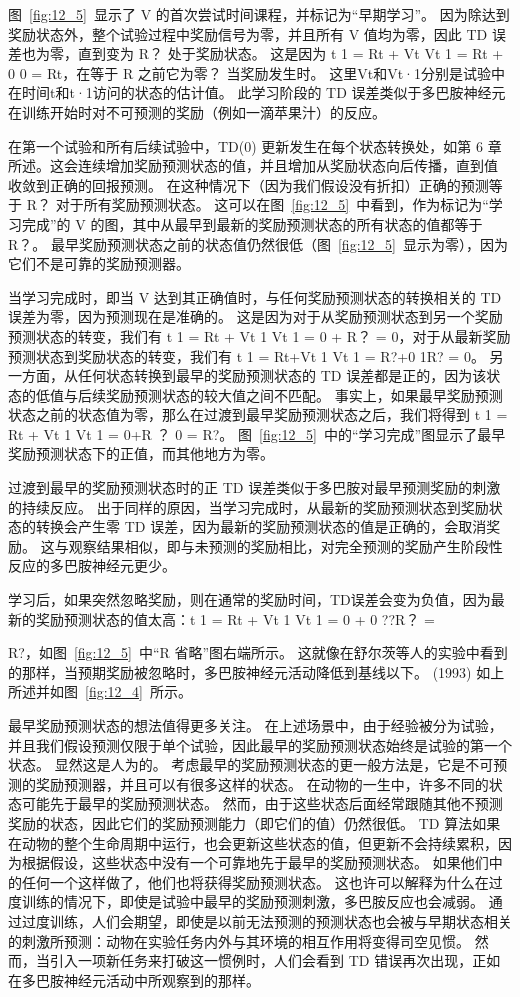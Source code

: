 {图~\ref{fig:12_5}~显示了 V 的首次尝试时间课程，并标记为“早期学习”。 
因为除达到奖励状态外，整个试验过程中奖励信号为零，并且所有 V 值均为零，因此 TD 误差也为零，直到变为 R？ 处于奖励状态。
这是因为 t 1 = Rt + Vt Vt 1 = Rt + 0 0 = Rt，在等于 R 之前它为零？ 
当奖励发生时。 这里Vt和Vt·1分别是试验中在时间t和t·1访问的状态的估计值。
此学习阶段的 TD 误差类似于多巴胺神经元在训练开始时对不可预测的奖励（例如一滴苹果汁）的反应。



在第一个试验和所有后续试验中，TD(0) 更新发生在每个状态转换处，如第 6 章所述。这会连续增加奖励预测状态的值，并且增加从奖励状态向后传播，直到值 收敛到正确的回报预测。
在这种情况下（因为我们假设没有折扣）正确的预测等于 R？ 对于所有奖励预测状态。
这可以在图~\ref{fig:12_5}~中看到，作为标记为“学习完成”的 V 的图，其中从最早到最新的奖励预测状态的所有状态的值都等于 R？。
最早奖励预测状态之前的状态值仍然很低（图~\ref{fig:12_5}~显示为零），因为它们不是可靠的奖励预测器。


当学习完成时，即当 V 达到其正确值时，与任何奖励预测状态的转换相关的 TD 误差为零，因为预测现在是准确的。
这是因为对于从奖励预测状态到另一个奖励预测状态的转变，我们有 t 1 = Rt + Vt 1 Vt 1 = 0 + R？ = 0，对于从最新奖励预测状态到奖励状态的转变，我们有 t 1 = Rt+Vt 1 Vt 1 = R?+0 1R? = 0。
另一方面，从任何状态转换到最早的奖励预测状态的 TD 误差都是正的，因为该状态的低值与后续奖励预测状态的较大值之间不匹配。
事实上，如果最早奖励预测状态之前的状态值为零，那么在过渡到最早奖励预测状态之后，我们将得到 t 1 = Rt + Vt 1 Vt 1 = 0+R ？ 0 = R?。 
图~\ref{fig:12_5}~中的“学习完成”图显示了最早奖励预测状态下的正值，而其他地方为零。


过渡到最早的奖励预测状态时的正 TD 误差类似于多巴胺对最早预测奖励的刺激的持续反应。
出于同样的原因，当学习完成时，从最新的奖励预测状态到奖励状态的转换会产生零 TD 误差，因为最新的奖励预测状态的值是正确的，会取消奖励。
这与观察结果相似，即与未预测的奖励相比，对完全预测的奖励产生阶段性反应的多巴胺神经元更少。


学习后，如果突然忽略奖励，则在通常的奖励时间，TD误差会变为负值，因为最新的奖励预测状态的值太高：t 1 = Rt + Vt 1 Vt 1 = 0 + 0 ??R？ = }R?，如图~\ref{fig:12_5}~中“R 省略”图右端所示。
这就像在舒尔茨等人的实验中看到的那样，当预期奖励被忽略时，多巴胺神经元活动降低到基线以下。 (1993) 如上所述并如图~\ref{fig:12_4}~所示。


最早奖励预测状态的想法值得更多关注。
在上述场景中，由于经验被分为试验，并且我们假设预测仅限于单个试验，因此最早的奖励预测状态始终是试验的第一个状态。
显然这是人为的。
考虑最早的奖励预测状态的更一般方法是，它是不可预测的奖励预测器，并且可以有很多这样的状态。
在动物的一生中，许多不同的状态可能先于最早的奖励预测状态。
然而，由于这些状态后面经常跟随其他不预测奖励的状态，因此它们的奖励预测能力（即它们的值）仍然很低。
TD 算法如果在动物的整个生命周期中运行，也会更新这些状态的值，但更新不会持续累积，因为根据假设，这些状态中没有一个可靠地先于最早的奖励预测状态。
如果他们中的任何一个这样做了，他们也将获得奖励预测状态。
这也许可以解释为什么在过度训练的情况下，即使是试验中最早的奖励预测刺激，多巴胺反应也会减弱。
通过过度训练，人们会期望，即使是以前无法预测的预测状态也会被与早期状态相关的刺激所预测：动物在实验任务内外与其环境的相互作用将变得司空见惯。
然而，当引入一项新任务来打破这一惯例时，人们会看到 TD 错误再次出现，正如在多巴胺神经元活动中所观察到的那样。


